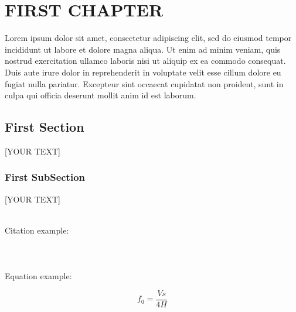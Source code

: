 \thispagestyle{empty}


\chapter{FIRST CHAPTER}
\label{chap:ch1}

Lorem ipsum dolor sit amet, consectetur adipiscing elit, sed do eiusmod
tempor incididunt ut labore et dolore magna aliqua. Ut enim ad minim
veniam, quis nostrud exercitation ullamco laboris nisi ut aliquip ex ea
commodo consequat. Duis aute irure dolor in reprehenderit in voluptate
velit esse cillum dolore eu fugiat nulla pariatur. Excepteur sint
occaecat cupidatat non proident, sunt in culpa qui officia deserunt
mollit anim id est laborum.


\section{First Section}
\label{sec:sec1}

[YOUR TEXT]

\subsection{First SubSection}

[YOUR TEXT]

\hfill \\


Citation example: \\
\citep{aki2002} \\
\citep{cauzzi2008} \\
\citep{danciu2010} \\


Equation example:

\begin{equation}
  f_0 = \frac{Vs}{4H}
  \label{eq:eq1}
\end{equation}

